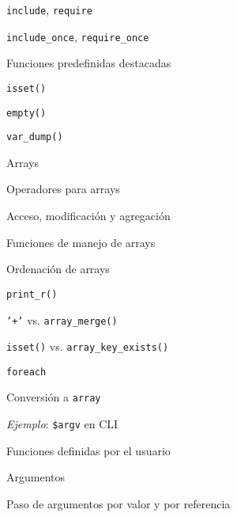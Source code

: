 \begin{longenum}
\begin{longenum}
\begin{longenum}
            \begin{longenum}
                \item \texttt{include}, \texttt{require}
                \item \texttt{include\_once}, \texttt{require\_once}
            \end{longenum}
        \end{longenum}
        \item Funciones predefinidas destacadas
        \begin{longenum}
            \item \texttt{isset()}
            \item \texttt{empty()}
            \item \texttt{var\_dump()}
        \end{longenum}
        \item Arrays
        \begin{longenum}
            \item Operadores para arrays
            \begin{longenum}
                \item Acceso, modificación y agregación
            \end{longenum}
            \item Funciones de manejo de arrays
            \begin{longenum}
                \item Ordenación de arrays
                \item \texttt{print\_r()}
                \item \texttt{'+'} vs. \texttt{array\_merge()}
                \item \texttt{isset()} vs. \texttt{array\_key\_exists()}
            \end{longenum}
            \item \texttt{foreach}
            \item Conversión a \texttt{array}
            \item \textit{Ejemplo}: \texttt{\$argv} en CLI
        \end{longenum}
        \item Funciones definidas por el usuario
        \begin{longenum}
            \item Argumentos
            \begin{longenum}
                \item Paso de argumentos por valor y por referencia

\end{longenum}
\end{longenum}
\end{longenum}
\end{longenum}
